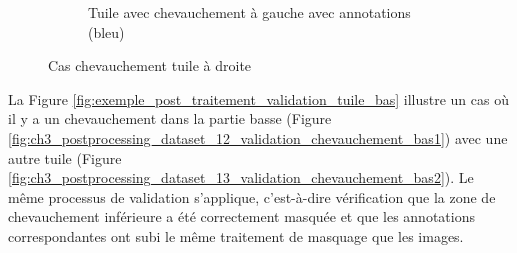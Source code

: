 \begin{figure}[H]
\begin{subfigure}[b]{0.49\textwidth}
        \caption{Tuile avec chevauchement à gauche avec annotations (bleu)}
        \label{fig:ch3_postprocessing_dataset_11_validation_chevauchement_droite4}
    \end{subfigure}    
    
    \caption{Cas chevauchement tuile à droite}
    \label{fig:exemple_post_traitement_validation_tuile_droite}
\end{figure}

La Figure \ref{fig:exemple_post_traitement_validation_tuile_bas} illustre un cas où il y a un chevauchement dans la partie basse (Figure \ref{fig:ch3_postprocessing_dataset_12_validation_chevauchement_bas1}) avec une autre tuile (Figure \ref{fig:ch3_postprocessing_dataset_13_validation_chevauchement_bas2}). Le même processus de validation s'applique, c'est-à-dire vérification que la zone de chevauchement inférieure a été correctement masquée et que les annotations correspondantes ont subi le même traitement de masquage que les images.


